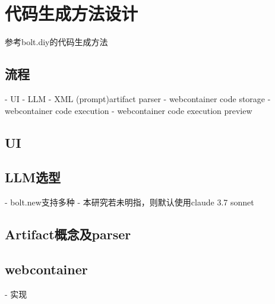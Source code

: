 
\chapter{代码生成方法设计}

参考bolt.diy的代码生成方法

\section{流程}

- UI
- LLM 
- XML (prompt)artifact parser
- webcontainer code storage
- webcontainer code execution
- webcontainer code execution preview

\section{UI}


\section{LLM选型}

- bolt.new支持多种
- 本研究若未明指，则默认使用claude 3.7 sonnet

\section{Artifact概念及parser}


\section{webcontainer}

- 实现